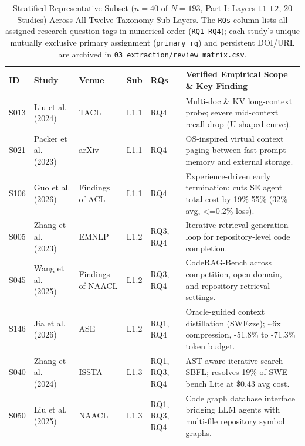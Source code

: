 \documentclass[10pt,twocolumn,a4paper]{article}
\begin{document}
\begin{table}[t!]
\centering
\caption{Stratified Representative Subset ($n = 40$ of $N = 193$, Part I: Layers \texttt{L1}--\texttt{L2}, 20 Studies) Across All Twelve Taxonomy Sub-Layers. The \texttt{RQs} column lists all assigned research-question tags in numerical order (\texttt{RQ1}--\texttt{RQ4}); each study's unique mutually exclusive primary assignment (\texttt{primary\_rq}) and persistent DOI/URL are archived in \texttt{03\_\allowbreak extraction/\allowbreak review\_\allowbreak matrix.\allowbreak csv}.}
\label{tab:rep40}
\scriptsize
\setlength{\tabcolsep}{3.2pt}
\renewcommand{\arraystretch}{0.95}
\begin{tabularx}{\textwidth}{l >{\raggedright\arraybackslash}p{2.65cm} >{\raggedright\arraybackslash}p{2.05cm} c >{\raggedright\arraybackslash}p{1.40cm} X}
\toprule
\textbf{ID} & \textbf{Study} & \textbf{Venue} & \textbf{Sub} & \textbf{RQs} & \textbf{Verified Empirical Scope \& Key Finding} \\
\midrule
S013 & Liu et al. (2024)~\cite{liu2024lost} & TACL & L1.1 & RQ4 & Multi-doc \& KV long-context probe; severe mid-context recall drop (U-shaped curve). \\
S021 & Packer et al. (2023)~\cite{packer2023memgpt} & arXiv & L1.1 & RQ4 & OS-inspired virtual context paging between fast prompt memory and external storage. \\
S106 & Guo et al. (2026)~\cite{guo2026eet} & Findings of ACL & L1.1 & RQ4 & Experience-driven early termination; cuts SE agent total cost by 19\%-55\% (32\% avg, <=0.2\% loss). \\
S005 & Zhang et al. (2023)~\cite{zhang2023repocoder} & EMNLP & L1.2 & RQ3, RQ4 & Iterative retrieval-generation loop for repository-level code completion. \\
S045 & Wang et al. (2025)~\cite{wang2025coderagbench} & Findings of NAACL & L1.2 & RQ3, RQ4 & CodeRAG-Bench across competition, open-domain, and repository retrieval settings. \\
S146 & Jia et al. (2026)~\cite{jia2026compressing} & ASE & L1.2 & RQ1, RQ4 & Oracle-guided context distillation (SWEzze); \textasciitilde{}6x compression, -51.8\% to -71.3\% token budget. \\
S040 & Zhang et al. (2024)~\cite{zhang2024autocoderover} & ISSTA & L1.3 & RQ1, RQ3, RQ4 & AST-aware iterative search + SBFL; resolves 19\% of SWE-bench Lite at \$0.43 avg cost. \\
S050 & Liu et al. (2025)~\cite{liu2025codexgraph} & NAACL & L1.3 & RQ1, RQ3, RQ4 & Code graph database interface bridging LLM agents with multi-file repository symbol graphs. \\

\end{tabularx}
\end{table}
\end{document}
